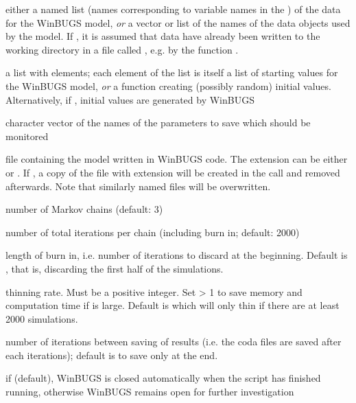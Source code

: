 \begin{Arguments}
\begin{ldescription}
\item[\code{data}] either a named list (names corresponding to variable names in the )
of the data for the WinBUGS model, \emph{or}
a vector or list of the names of the data objects used by the model.
If , it is assumed that data have already been written to the working directory
in a file called , e.g. by the function .
\item[\code{inits}] a list with  elements; each element of the list is
itself a list of starting values for the WinBUGS model, \emph{or}
a function creating (possibly random) initial values.
Alternatively, if , initial values are generated by WinBUGS
\item[\code{parameters.to.save}] character vector of the names of the parameters to save which should be monitored
\item[\code{model.file}] file containing the model written in WinBUGS code.
The extension can be either  or .
If , a copy of the file with extension  will be created
in the  call and removed afterwards.
Note that similarly named  files will be overwritten.
\item[\code{n.chains}] number of Markov chains (default: 3)
\item[\code{n.iter}] number of total iterations per chain (including burn in; default: 2000)
\item[\code{n.burnin}] length of burn in, i.e. number of iterations to discard at the beginning.
Default is , that is, discarding the first half of the simulations.
\item[\code{n.thin}] thinning rate.  Must be a positive integer.
Set  > 1 to save memory and computation time if  is large.
Default is 
which will only thin if there are at least 2000 simulations.
\item[\code{bin}] number of iterations between saving of results
(i.e. the coda files are saved after each  iterations);
default is to save only at the end.
\item[\code{debug}] if  (default), WinBUGS is closed automatically
when the script has finished running, otherwise WinBUGS remains open for further investigation

\end{ldescription}
\end{Arguments}
